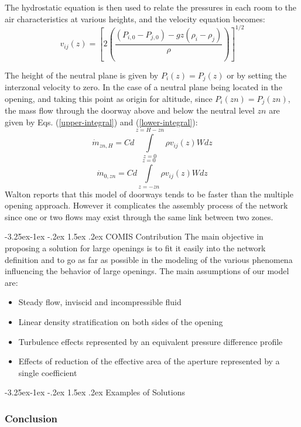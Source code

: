 \documentclass[12pt]{report}
\makeatletter
\newcommand\subsubparagraph{\@startsection{paragraph}{5}{\z@}%
                                      {-3.25ex\@plus -1ex \@minus -.2ex}%
                                      {1.5ex \@plus .2ex}
                                      {\normalfont\normalsize\bfseries}}
\makeatother
\begin{document}
The hydrostatic equation is then used to relate the pressures in each room to the
air characteristics at various heights, and the velocity equation becomes: 
\begin{equation}\label{height-velocity-equation}
v_{ij}(z) = \left[2\left(\frac{\left(P_{i,0}-P_{j,0}\right)-gz\left(\rho_i-\rho_j\right)}{\rho}\right)\right]^{1/2}
\end{equation}

The height of the neutral plane is given by $P_i (z) = P_j(z)$ or by setting the interzonal velocity to zero.
In the case of a neutral plane being located in the opening,
and taking this point as origin for altitude, since $P_i(zn) =P_j(zn)$, the mass flow
through the doorway above and below the neutral level $zn$ are given by Eqs. (\ref{upper-integral})
and (\ref{lower-integral}):
\begin{equation}\label{upper-integral}
\dot{m}_{zn,H} = Cd \int\limits_{z=0}^{z=H-zn}\rho v_{ij}(z) W dz
\end{equation}
%
\begin{equation}\label{lower-integral}
\dot{m}_{0,zn} = Cd \int\limits_{z=-zn}^{z=0}\rho v_{ij}(z) W dz
\end{equation}
%
Walton \cite{walton_1984} reports that this model of doorways tends to be faster than the multiple opening approach.
However it complicates the assembly process of the network since one or two flows may exist through the same link
between two zones. 

\subsubparagraph{COMIS Contribution}
The main objective in proposing a solution for large openings is to fit it easily
into the network definition and to go as far as possible in the modeling of the
various phenomena influencing the behavior of large openings.
The main assumptions of our model are:
\begin{itemize}
\item Steady flow, inviscid and incompressible fluid
\item Linear density stratification on both sides of the opening
\item Turbulence effects represented by an equivalent pressure difference profile
\item Effects of reduction of the effective area of the aperture represented by a single
coefficient 
\end{itemize}
\subsubparagraph{Examples of Solutions}
\subsubsection{Conclusion}



\end{document}
